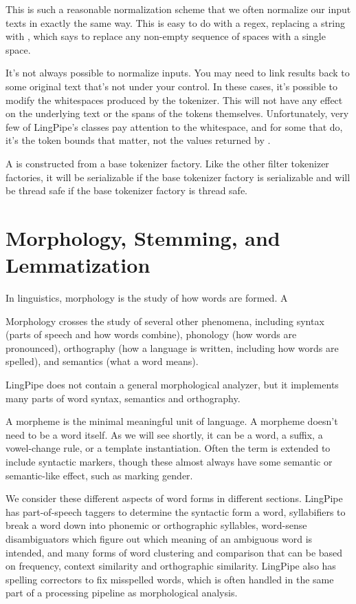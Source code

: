 This is such a reasonable normalization scheme that we often normalize
our input texts in exactly the same way.  This is easy to do with a
regex, replacing a string  with
, which says to replace
any non-empty sequence of spaces with a single space. 

It's not always possible to normalize inputs.  You may need to link
results back to some original text that's not under your control.  In
these cases, it's possible to modify the whitespaces produced by the
tokenizer.  This will not have any effect on the underlying text or
the spans of the tokens themselves.  Unfortunately, very few of
LingPipe's classes pay attention to the whitespace, and for some that
do, it's the token bounds that matter, not the values returned by
.

A  is constructed from a base
tokenizer factory.  Like the other filter tokenizer factories, it will
be serializable if the base tokenizer factory is serializable and will
be thread safe if the base tokenizer factory is thread safe.


\section{Morphology, Stemming, and Lemmatization}

In linguistics, morphology is the study of how words are formed.  A

Morphology crosses the study of several other phenomena,
including syntax (parts of speech and how words combine), phonology
(how words are pronounced), orthography (how a language is written,
including how words are spelled), and semantics (what a word means).

LingPipe does not contain a general morphological analyzer, but it
implements many parts of word syntax, semantics and orthography.

A morpheme is the minimal meaningful unit of language.  A morpheme
doesn't need to be a word itself.  As we will see shortly, it can be a
word, a suffix, a vowel-change rule, or a template instantiation.
Often the term is extended to include syntactic markers, though these
almost always have some semantic or semantic-like effect, such as
marking gender.

We consider these different aspects of word forms in different
sections.  LingPipe has part-of-speech taggers to determine the
syntactic form a word, syllabifiers to break a word down into phonemic
or orthographic syllables, word-sense disambiguators which figure out
which meaning of an ambiguous word is intended, and many forms of word
clustering and comparison that can be based on frequency, context
similarity and orthographic similarity.  LingPipe also has spelling
correctors to fix misspelled words, which is often handled in the
same part of a processing pipeline as morphological analysis.

